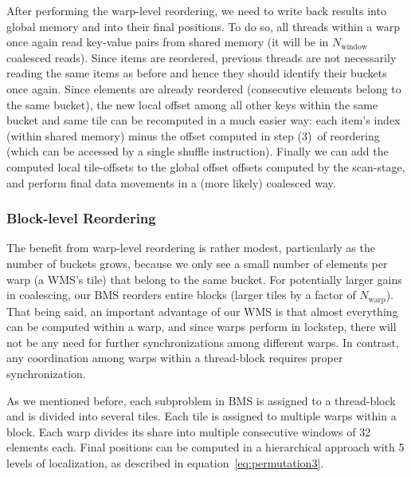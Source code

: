 After performing the warp-level reordering, we need to write back results into global memory and into their final positions. To do so, all threads within a warp once again read key-value pairs from shared memory (it will be in $N_\text{window}$ coalesced reads).
Since items are reordered, previous threads are not necessarily reading the same items as before and hence they should identify their buckets once again.
Since elements are already reordered (consecutive elements belong to the same bucket), the new local offset among all other keys within the same bucket and same tile can be recomputed in a much easier way: each item's index (within shared memory) minus the offset computed in step (3)~of reordering (which can be accessed by a single shuffle instruction).
Finally we can add the computed local tile-offsets to the global offset offsets computed by the scan-stage, and perform final data movements in a (more likely) coalesced way.

\subsubsection{Block-level Reordering}\label{subsubsec:block_reordering}
The benefit from warp-level reordering is rather modest, particularly as the number of buckets grows, because we only see a small number of elements per warp (a WMS's tile) that belong to the same bucket. For potentially larger gains in coalescing, our BMS reorders entire blocks (larger tiles by a factor of $N_\text{warp}$).
That being said, an important advantage of our WMS is that almost everything can be computed within a warp, and since warps perform in lockstep, there will not be any need for further synchronizations among different warps.
In contrast, any coordination among warps within a thread-block requires proper synchronization.

As we mentioned before, each subproblem in BMS is assigned to a thread-block and is divided into several tiles. Each tile is assigned to multiple warps within a block. Each warp divides its share into multiple consecutive windows of 32 elements each.
Final positions can be computed in a hierarchical approach with 5 levels of localization, as described in equation~\ref{eq:permutation3}.

